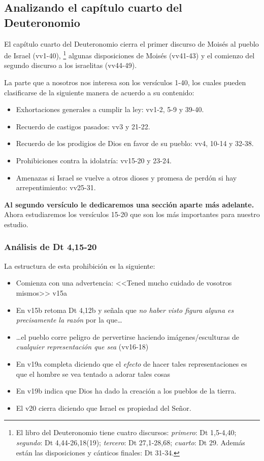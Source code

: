 \documentclass{article}
\begin{document}
\subsection{Analizando el cap\'{i}tulo cuarto del Deuteronomio}

El cap\'{i}tulo cuarto del Deuteronomio cierra el primer discurso de Mois\'es al pueblo de Israel (vv1-40),%
    \footnote{El libro del Deuteronomio tiene cuatro discursos: \emph{primero}: Dt 1,5-4,40; \emph{segundo}: Dt 4,44-26,18(19); \emph{tercero}: Dt 27,1-28,68; \emph{cuarto}: Dt 29. Adem\'as est\'an las disposiciones y c\'anticos finales: Dt 31-34.}
algunas disposiciones de Mois\'es (vv41-43) y el comienzo del segundo discurso a los israelitas (vv44-49).

La parte que a nosotros nos interesa son los vers\'{i}culos 1-40, los cuales pueden clasificarse de la siguiente manera de acuerdo a su contenido:

\begin{itemize}
\item Exhortaciones generales a cumplir la ley: vv1-2, 5-9 y 39-40.
\item Recuerdo de castigos pasados: vv3 y 21-22.
\item Recuerdo de los prodigios de Dios en favor de su pueblo: vv4, 10-14 y 32-38.
\item Prohibiciones contra la idolatr\'{i}a: vv15-20 y 23-24.
\item Amenazas si Israel se vuelve a otros dioses y promesa de perd\'on si hay arrepentimiento: vv25-31.
\end{itemize}

\noindent
\textbf{Al segundo vers\'{i}culo le dedicaremos una secci\'on aparte m\'as adelante.} Ahora estudiaremos los vers\'iculos 15-20 que son los m\'as importantes para nuestro estudio.

\subsubsection{An\'alisis de Dt 4,15-20}

La estructura de esta prohibici\'on es la siguiente:

\begin{itemize}
\item Comienza con una advertencia: <<Tened mucho cuidado de vosotros mismos>> v15a
\item En v15b retoma Dt 4,12b y se\~nala que \emph{no haber visto figura alguna es precisamente la raz\'on} por la que\ldots
\item {\ldots}el pueblo corre peligro de pervertirse haciendo im\'agenes/esculturas de \emph{cualquier representaci\'on que sea} (vv16-18)
\item En v19a completa diciendo que el \emph{efecto} de hacer tales representaciones es que el hombre se vea tentado a adorar tales cosas
\item En v19b indica que Dios ha dado la creaci\'on a los pueblos de la tierra.
\item El v20 cierra diciendo que Israel es propiedad del Se\~nor.
\end{itemize}
\end{document}

